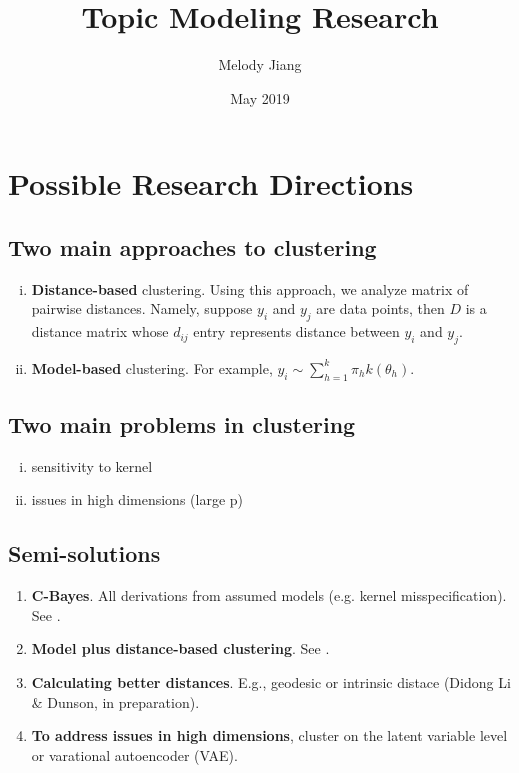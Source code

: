 \documentclass{article}
\title{Topic Modeling Research}
\author{Melody Jiang}
\date{May 2019}
\begin{document}
\maketitle

\section{Possible Research Directions}

\subsection{Two main approaches to clustering}

\begin{enumerate}[(i)]
  \item \textbf{Distance-based} clustering. Using this approach, we analyze matrix of pairwise distances. Namely, suppose $y_i$ and $y_j$ are data points, then $D$ is a distance matrix whose $d_{ij}$ entry represents distance between $y_i$ and $y_j$.
  \item \textbf{Model-based} clustering. For example, $y_i \sim \sum_{h = 1}^k \pi_h k(\theta_h)$.
\end{enumerate}

\subsection{Two main problems in clustering}

\begin{enumerate}[(i)]
  \item sensitivity to kernel
  \item issues in high dimensions (large p)
\end{enumerate}

\subsection{Semi-solutions}

\begin{enumerate}
  \item \textbf{C-Bayes}. All derivations from assumed models (e.g. kernel misspecification). See \cite{miller2018robust}.
  \item \textbf{Model plus distance-based clustering}.
  See \cite{duan2018bayesian}.
  \item \textbf{Calculating better distances}. E.g., geodesic or intrinsic distace (Didong Li \& Dunson, in preparation).
  \item \textbf{To address issues in high dimensions}, cluster on the latent variable level or varational autoencoder (VAE). 
\end{enumerate}






\end{document}
